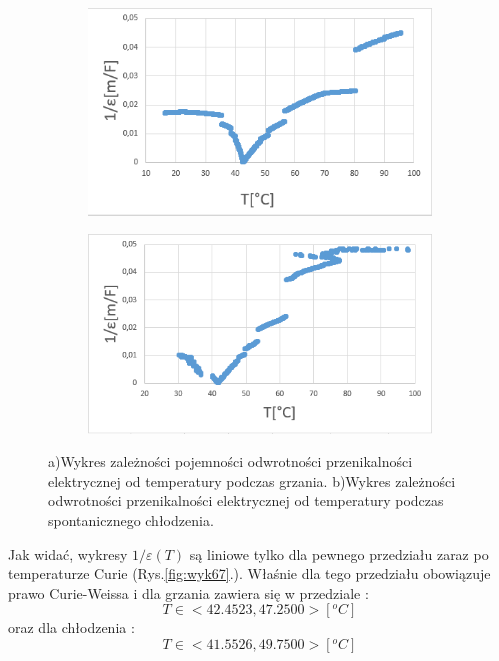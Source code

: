 \documentclass{article}
\begin{document}
\begin{figure}[h!]
  \centering
  \begin{subfigure}[b]{0.49\linewidth}
    \includegraphics[width=\linewidth]{wyk4.png}
    \caption{}
  \end{subfigure}
  \begin{subfigure}[b]{0.49\linewidth}
    \includegraphics[width=\linewidth]{wyk5.png}
    \caption{}
  \end{subfigure}
  \caption{a)Wykres zależności pojemności odwrotności przenikalności elektrycznej od temperatury podczas grzania. b)Wykres zależności odwrotności przenikalności elektrycznej od temperatury podczas spontanicznego chłodzenia.}
  \label{fig:wyk45}
\end{figure}

Jak widać, wykresy $1/\varepsilon(T)$ są liniowe tylko dla pewnego przedziału zaraz po temperaturze Curie (Rys.\ref{fig:wyk67}.). Właśnie dla tego przedziału obowiązuje prawo Curie-Weissa i dla grzania zawiera się w przedziale :
\begin{equation}
T\in <42.4523 , 47.2500> [^{o}C]
\end{equation}
oraz dla chłodzenia :
\begin{equation}
T\in <41.5526 , 49.7500> [^{o}C]
\end{equation}
\end{document}
